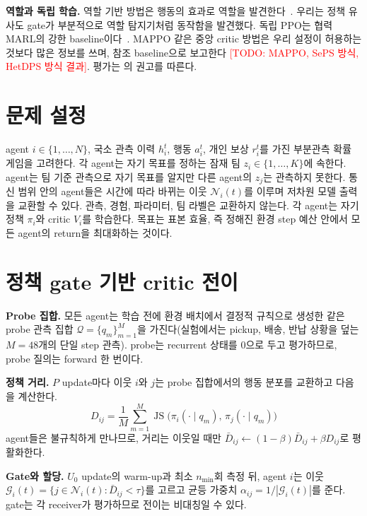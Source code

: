 \documentclass[twocolumn,10pt]{article}
\newcommand{\todo}[1]{\textcolor{red}{[TODO: #1]}}
\newcommand{\JS}{\operatorname{JS}}
\begin{document}
\textbf{역할과 독립 학습.} 역할 기반 방법은 행동의 효과로 역할을 발견한다~\cite{wang2021rode}. 우리는 정책 유사도 gate가 부분적으로
역할 탐지기처럼 동작함을 발견했다. 독립 PPO는 협력 MARL의 강한 baseline이다~\cite{schulman2017ppo,dewitt2020ippo}. MAPPO
\cite{yu2022mappo} 같은 중앙 critic 방법은 우리 설정이 허용하는 것보다 많은 정보를 쓰며, 참조 baseline으로 보고한다
\todo{MAPPO, SePS 방식, HetDPS 방식 결과}. 평가는 \cite{agarwal2021precipice}의 권고를 따른다.

\section{문제 설정}
agent $i\in\{1,\dots,N\}$, 국소 관측 이력 $h_i^t$, 행동 $a_i^t$, 개인 보상 $r_i^t$를 가진 부분관측 확률 게임을 고려한다. 각 agent는
자기 목표를 정하는 잠재 팀 $z_i\in\{1,\dots,K\}$에 속한다. agent는 팀 기준 관측으로 자기 목표를 알지만 다른 agent의 $z_j$는
관측하지 못한다. 통신 범위 안의 agent들은 시간에 따라 바뀌는 이웃 $\mathcal{N}_i(t)$를 이루며 저차원 모델 출력을 교환할 수 있다.
관측, 경험, 파라미터, 팀 라벨은 교환하지 않는다. 각 agent는 자기 정책 $\pi_i$와 critic $V_i$를 학습한다. 목표는 표본 효율, 즉 정해진
환경 step 예산 안에서 모든 agent의 return을 최대화하는 것이다.

\section{정책 gate 기반 critic 전이}
\label{sec:method}
\textbf{Probe 집합.} 모든 agent는 학습 전에 환경 배치에서 결정적 규칙으로 생성한 같은 probe 관측 집합
$\mathcal{Q}=\{q_m\}_{m=1}^{M}$을 가진다(실험에서는 pickup, 배송, 반납 상황을 덮는 $M=48$개의 단일 step 관측). probe는 recurrent
상태를 0으로 두고 평가하므로, probe 질의는 forward 한 번이다.

\textbf{정책 거리.} $P$ update마다 이웃 $i$와 $j$는 probe 집합에서의 행동 분포를 교환하고 다음을 계산한다.
\begin{equation}
  D_{ij} = \frac{1}{M}\sum_{m=1}^{M} \JS\big(\pi_i(\cdot\mid q_m),\, \pi_j(\cdot\mid q_m)\big)
\end{equation}
agent들은 불규칙하게 만나므로, 거리는 이웃일 때만 $\bar D_{ij}\leftarrow(1-\beta)\bar D_{ij}+\beta D_{ij}$로 평활화한다.

\textbf{Gate와 할당.} $U_0$ update의 warm-up과 최소 $n_{\min}$회 측정 뒤, agent $i$는 이웃
$\mathcal{G}_i(t)=\{j\in\mathcal{N}_i(t): \bar D_{ij}<\tau\}$를 고르고 균등 가중치 $\alpha_{ij}=1/|\mathcal{G}_i(t)|$를 준다. gate는 각
receiver가 평가하므로 전이는 비대칭일 수 있다.
\end{document}
